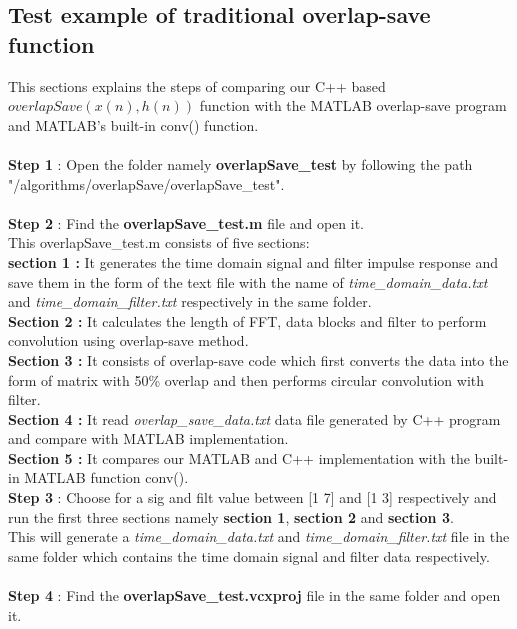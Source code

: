 \subsection*{Test example of traditional overlap-save function}
This sections explains the steps of comparing our C++ based $overlapSave(x(n), h(n))$ function with the MATLAB overlap-save program and MATLAB's built-in conv() function.\\ \\
\textbf{Step 1} : Open the folder namely \textbf{overlapSave\_test} by following the path "/algorithms/overlapSave/overlapSave\_test".\\ \\
\textbf{Step 2} : Find the \textbf{overlapSave\_test.m} file and open it.\\
This overlapSave\_test.m consists of five sections:\\
\textbf{section 1 :} It generates the time domain signal and filter impulse response  and save them in the form of the text file with the name of \textit{time\_domain\_data.txt} and \textit{time\_domain\_filter.txt} respectively in the same folder.\\
\textbf{Section 2 :} It calculates the length of FFT, data blocks and filter to perform convolution using overlap-save method.\\
\textbf{Section 3 :} It consists of overlap-save code which first converts the data into the form of matrix with 50\% overlap and then performs circular convolution with filter.\\
\textbf{Section 4 :} It read \textit{overlap\_save\_data.txt} data file generated by C++ program and compare with MATLAB implementation. \\
\textbf{Section 5 :} It compares our MATLAB and C++ implementation with the built-in MATLAB function conv(). \\

\textbf{Step 3} : Choose for a sig and filt value between [1 7] and [1 3] respectively and run the first three sections namely \textbf{section 1}, \textbf{section 2} and \textbf{section 3}.\\
This will generate a \textit{time\_domain\_data.txt} and \textit{time\_domain\_filter.txt} file in the same folder which contains the time domain signal and filter data respectively.\\ \\
\textbf{Step 4} : Find the \textbf{overlapSave\_test.vcxproj} file in the same folder and open it.\\
